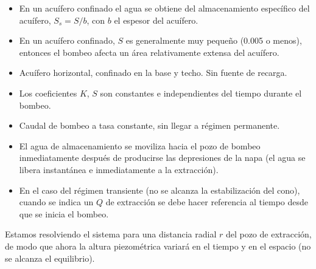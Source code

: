 \begin{itemize}
  \item En un acuífero confinado el agua se obtiene del almacenamiento
        específico del acuífero, $S_s=S/b$, con $b$ el espesor del acuífero.
  \item En un acuífero confinado, $S$ es generalmente muy pequeño (0.005 o
        menos), entonces el bombeo afecta un área relativamente extensa del acuífero.
  \item Acuífero horizontal, confinado en la base y techo. Sin fuente de recarga.
  \item Los coeficientes $K$, $S$ son constantes e independientes del tiempo
        durante el bombeo.
  \item Caudal de bombeo a tasa constante, sin llegar a régimen permanente.
  \item El agua de almacenamiento se moviliza hacia el pozo de bombeo
        inmediatamente después de producirse las depresiones de la napa (el
        agua se libera instantánea e inmediatamente a la extracción).
  \item En el caso del régimen transiente (no se alcanza la estabilización del
        cono), cuando se indica un $Q$ de extracción se debe hacer referencia
        al tiempo desde que se inicia el bombeo.
\end{itemize}
\textcolor{rojo}{Estamos resolviendo el sistema para una distancia radial $r$
del pozo de extracción, de modo que ahora la altura piezométrica variará en
el tiempo y en el espacio (no se alcanza el equilibrio).}

\newcommand{\pozotransiente}[1]{%
\begin{tikzpicture}[font=\small,scale=0.9]
  \draw[thick] (-4,0) -- (4,0);
  \foreach \x in {-3.9,-3.6,...,3.9} \draw (\x,0) -- (\x-0.2,-0.25);
  \draw[thick] (-0.4,0.05) -- (-0.4,4.4) (0.4,0.05) -- (0.4,4.4);
  \draw[thick] (-4,4.4) -- (-0.4,4.4) (0.4,4.4) -- (4,4.4);
  \fill[azulusm] (-0.1,4.2) rectangle (0.1,4.9);
  \fill[azulusm] (-0.25,4.9) -- (0.25,4.9) -- (0,5.25) -- cycle; \node at (0.55,5.1) {$Q$};
  \draw[cyan!70!blue,thick] (-4,3.6) -- (-0.4,3.6) (0.4,3.6) -- (4,3.6);
  \node[left] at (-4,3.6) {$t=0$};
  \draw[dashed,cyan!70!blue,thick] (-4,3.1) .. controls (-2,2.9) and (-1,2.6) .. (-0.4,2.3);
  \draw[dashed,cyan!70!blue,thick] (0.4,2.3) .. controls (1,2.6) and (2,2.9) .. (4,3.1);
  \draw[cyan!70!blue,thick] (-0.4,2.3) -- (0.4,2.3);
  \node[left] at (-4,3.1) {$t=t$};
  \ifnum#1=1
    \draw[thick] (-4,2.0) -- (-0.4,2.0) (0.4,2.0) -- (4,2.0);
    \foreach \x in {-3.9,-3.6,...,-0.6,0.6,0.9,...,3.9} \draw (\x,2.0) -- (\x+0.15,2.25);
    \draw[cota] (-3.3,0) -- (-3.3,2.0) node[midway,left]{$m$};
    \def\ytop{1.8}
  \else
    \def\ytop{2.0}
  \fi
  \foreach \y in {0.3,0.6,...,\ytop}{\draw[->,azulusm] (-1.3,\y) -- (-0.5,\y);\draw[->,azulusm] (1.3,\y) -- (0.5,\y);}
  \node[right] at (1.3,1.0) {$Q_i$};
  \draw[cota] (-2.3,0) -- (-2.3,3.6) node[midway,right]{$H$};
  \draw[cota] (2.8,0) -- (2.8,2.95) node[midway,right]{$h(r,t)$};
  \draw[->] (0,-0.5) -- (2.8,-0.5) node[midway,below]{$r$};
\end{tikzpicture}}

